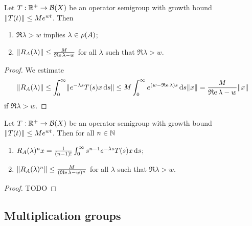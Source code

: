 \begin{corollary} \label{resolventGeneratorEstimate}
Let $T: \mathbb{R}^+\to \operatorname{\mathcal{B}}(X)$ be an operator semigroup with growth bound $\lVert T(t)\rVert\leq Me^{wt}$. Then
\begin{enumerate}
\item $\Re \lambda > w$ implies $\lambda \in\rho(A)$;
\item $\lVert R_A(\lambda)\rVert \leq \frac{M}{\operatorname{\mathfrak{R}e} \lambda - w}$ for all $\lambda$ such that $\Re \lambda > w$.
\end{enumerate}
\end{corollary}
\begin{proof}
We estimate
\[ \lVert R_A(\lambda)\rVert \leq \int_0^\infty\lVert e^{-\lambda s}T(s)x\operatorname{d \!}{s}\rVert \leq M\int_0^\infty e^{(w-\operatorname{\mathfrak{R}e}\lambda)s}\operatorname{d \!}{s}\lVert x\rVert = \frac{M}{\operatorname{\mathfrak{R}e}\lambda - w}\lVert x\rVert \]
if $\Re \lambda > w$. 
\end{proof}
\begin{corollary} \label{resolventGeneratorPowerEstimate}
Let $T: \mathbb{R}^+\to \operatorname{\mathcal{B}}(X)$ be an operator semigroup with growth bound $\lVert T(t)\rVert\leq Me^{wt}$. Then for all $n\in \mathbb{N}$
\begin{enumerate}
\item $R_A(\lambda)^n x = \frac{1}{(n-1)!}\int_0^\infty s^{n-1}e^{-\lambda s}T(s)x\operatorname{d \!}{s}$;
\item $\lVert R_A(\lambda)^n\rVert \leq \frac{M}{(\operatorname{\mathfrak{R}e} \lambda - w)^n}$ for all $\lambda$ such that $\Re \lambda > w$.
\end{enumerate}
\end{corollary}
\begin{proof}
TODO
\end{proof}

\subsection{Multiplication groups}

